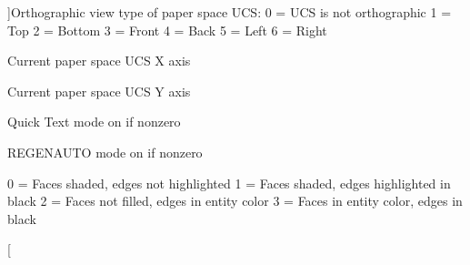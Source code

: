 \begin{Desc}
\begin{description}
{}]Orthographic view type of paper space U\+CS\+: 0 = U\+CS is not orthographic 1 = Top 2 = Bottom 3 = Front 4 = Back 5 = Left 6 = Right \item[{\em 
P\+U\+C\+S\+X\+D\+IR\hypertarget{class_c_a_d_header_abd894aab7aa85b4c4634e67fb93d6886acd0dc2de2eddca02e3e5ef9ba28df707}{}\label{class_c_a_d_header_abd894aab7aa85b4c4634e67fb93d6886acd0dc2de2eddca02e3e5ef9ba28df707}
}]Current paper space U\+CS X axis \item[{\em 
P\+U\+C\+S\+Y\+D\+IR\hypertarget{class_c_a_d_header_abd894aab7aa85b4c4634e67fb93d6886a7a33cb15687b8a798d27adb47991aaf1}{}\label{class_c_a_d_header_abd894aab7aa85b4c4634e67fb93d6886a7a33cb15687b8a798d27adb47991aaf1}
}]Current paper space U\+CS Y axis \item[{\em 
Q\+T\+E\+X\+T\+M\+O\+DE\hypertarget{class_c_a_d_header_abd894aab7aa85b4c4634e67fb93d6886a1b42d547886b05e0e4b3f0810b318f6a}{}\label{class_c_a_d_header_abd894aab7aa85b4c4634e67fb93d6886a1b42d547886b05e0e4b3f0810b318f6a}
}]Quick Text mode on if nonzero \item[{\em 
R\+E\+G\+E\+N\+M\+O\+DE\hypertarget{class_c_a_d_header_abd894aab7aa85b4c4634e67fb93d6886a29296a568f18a258dc47cd75a6d7cf03}{}\label{class_c_a_d_header_abd894aab7aa85b4c4634e67fb93d6886a29296a568f18a258dc47cd75a6d7cf03}
}]R\+E\+G\+E\+N\+A\+U\+TO mode on if nonzero \item[{\em 
S\+H\+A\+D\+E\+D\+GE\hypertarget{class_c_a_d_header_abd894aab7aa85b4c4634e67fb93d6886a7c5f32a4146f387dceb152ca2944038e}{}\label{class_c_a_d_header_abd894aab7aa85b4c4634e67fb93d6886a7c5f32a4146f387dceb152ca2944038e}
}]0 = Faces shaded, edges not highlighted 1 = Faces shaded, edges highlighted in black 2 = Faces not filled, edges in entity color 3 = Faces in entity color, edges in black \item[{\em 
}
\end{description}
\end{Desc}
